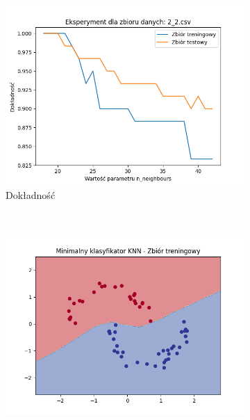 \documentclass[12pt]{article}
\newcommand*{\subfigwidth}{0.24\textwidth}
\begin{document}
\clearpage
\begin{figure}[H]\centering
    \begin{subfigure}[t]{\subfigwidth}
        \includegraphics[width=\linewidth]{img/exp_3/knn/2_2/accuracy.png}
        \caption{Dokładność}
    \end{subfigure}
    \\
    \begin{subfigure}[t]{\subfigwidth}
        \includegraphics[width=\linewidth]{img/exp_3/knn/2_2/min/train_boundary.png}

\end{subfigure}
\end{figure}
\end{document}
